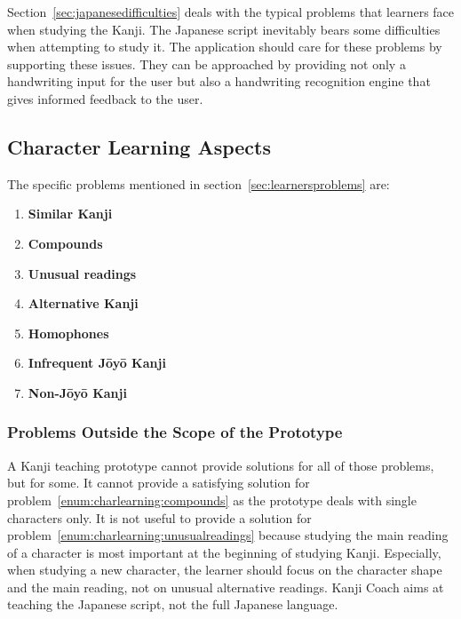 Section~\ref{sec:japanesedifficulties} deals with the typical problems that 
learners face when studying the Kanji. The Japanese script inevitably bears some 
difficulties when attempting to study it. The application should care for these 
problems by supporting these issues. They can be approached by providing
not only a handwriting input for the user but also a handwriting recognition
engine that gives informed feedback to the user.

\subsection{Character Learning Aspects}
\label{sec:concept:charaterlearningaspects}

The specific problems mentioned in section~\ref{sec:learnersproblems} are:
\begin{enumerate}
  \item \textbf{Similar Kanji} \label{enum:charlearning:similarKanji}
  \item \textbf{Compounds} \label{enum:charlearning:compounds}
  \item \textbf{Unusual readings} \label{enum:charlearning:unusualreadings}
  \item \textbf{Alternative Kanji} \label{enum:charlearning:alternativeKanji}
  \item \textbf{Homophones} \label{enum:charlearning:homophones}
  \item \textbf{Infrequent Jōyō Kanji} \label{enum:charlearning:infrequenjoyo}
  \item \textbf{Non-Jōyō Kanji} \label{enum:charlearning:nonjoyo}
\end{enumerate}

\subsubsection{Problems Outside the Scope of the Prototype}
\label{sec:concept:problemsoutsidescope}

A Kanji teaching prototype cannot provide solutions for all of those problems,
but for some. It cannot provide a satisfying solution for 
problem~\ref{enum:charlearning:compounds} as the prototype deals with single
characters only. It is not useful to provide a solution for 
problem~\ref{enum:charlearning:unusualreadings} because studying the main
reading of a character is most important at the beginning of studying Kanji. 
Especially, when studying a new character, the learner should focus on the 
character shape and the main reading, not on unusual alternative readings. 
Kanji Coach aims at teaching the Japanese script, not the full Japanese language.

